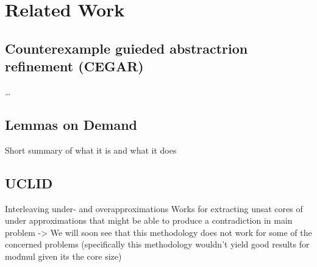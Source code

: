 \chapter{Related Work}
\label{ch:related_work}


\section{Counterexample guieded abstractrion refinement (CEGAR)}
\dots
\section{Lemmas on Demand}
Short summary of what it is and what it does
\section{UCLID}
Interleaving under- and overapproximations
Works for extracting unsat cores of under approximations that might be able to produce a contradiction in main problem
-> We will soon see that this methodology does not work for some of the concerned problems (specifically this methodology wouldn't yield good results for modmul given its the core size)
